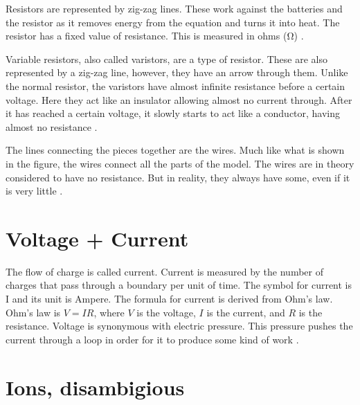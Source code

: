 \documentclass[Orator]{subfiles}
\begin{document}
Resistors are represented by zig-zag lines. These work against the batteries and the resistor as it removes energy from the equation and turns it into heat. The resistor has a fixed value of resistance. This is measured in ohms (\unit{\ohm}) \cite{}.

Variable resistors, also called varistors, are a type of resistor. These are also represented by a zig-zag line, however, they have an arrow through them. Unlike the normal resistor, the varistors have almost infinite resistance before a certain voltage. Here they act like an insulator allowing almost no current through. After it has reached a certain voltage, it slowly starts to act like a conductor, having almost no resistance \cite{}. 

The lines connecting the pieces together are the wires. Much like what is shown in the figure, the wires connect all the parts of the model. The wires are in theory considered to have no resistance. But in reality, they always have some, even if it is very little \cite{}. 


 \section{Voltage + Current}
The flow of charge is called current. Current is measured by the number of charges that pass through a boundary per unit of time. The symbol for current is I and its unit is Ampere. The formula for current is derived from Ohm's law. Ohm's law is \(V=IR\), where \(V\) is the voltage, \(I\) is the current, and \(R\) is the resistance. Voltage is synonymous with electric pressure. This pressure pushes the current through a loop in order for it to produce some kind of work \cite{}. 


\section{Ions, disambigious}


\end{document}
